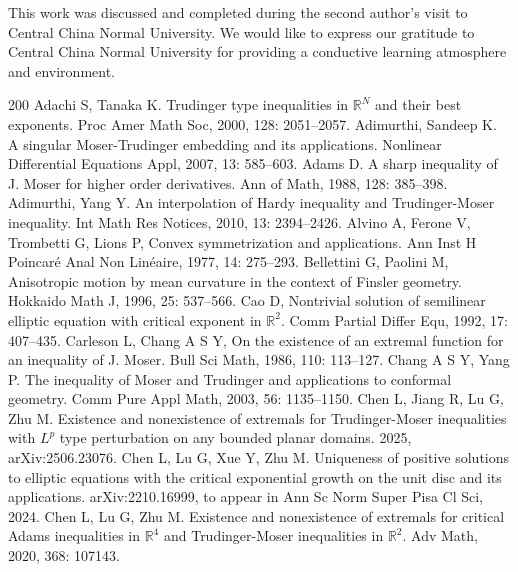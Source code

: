 \documentclass[11pt]{article}
\theoremstyle{plain}
\numberwithin{equation}{section}
\begin{document}
  This work was discussed and completed during the second author's visit to Central China Normal University. We would like to express our gratitude to Central China Normal University for providing a conductive learning atmosphere and environment.\\


\def\refname{References }
\begin{thebibliography}{200}
 Adachi S, Tanaka K. Trudinger type inequalities in $\mathbb{R}^{N}$ and their best exponents. Proc Amer Math Soc, 2000, 128: 2051--2057.
 Adimurthi, Sandeep K. A singular Moser-Trudinger embedding and its applications. Nonlinear Differential Equations Appl, 2007, 13: 585--603.
 Adams D. A sharp inequality of J. Moser for higher order derivatives.  Ann of Math, 1988, 128: 385--398.
 Adimurthi,  Yang Y. An interpolation of Hardy inequality and Trudinger-Moser inequality. Int Math Res Notices, 2010, 13: 2394--2426.
 Alvino A, Ferone V, Trombetti G, Lions P, Convex symmetrization and applications. Ann Inst H Poincar\'{e} Anal Non Lin\'{e}aire, 1977, 14: 275--293.
 Bellettini G, Paolini M, Anisotropic motion by mean curvature in the context of Finsler geometry.  Hokkaido Math J, 1996, 25: 537--566.
 Cao D,  Nontrivial solution of semilinear elliptic equation with critical exponent in $\mathbb{R}^{2}$.  Comm Partial Differ Equ,
1992, 17: 407--435.
 Carleson  L, Chang A S Y, On the existence of an extremal function for an inequality of J. Moser. Bull Sci Math, 1986, 110: 113--127.
  Chang A S Y,  Yang P. The inequality of Moser and Trudinger and applications to conformal
geometry. Comm Pure Appl Math,  2003, 56:  1135--1150.
 Chen L, Jiang R, Lu G, Zhu M. Existence and nonexistence of extremals for Trudinger-Moser inequalities with $L^p$ type perturbation on any bounded planar domains. 2025, arXiv:2506.23076.
 Chen L,  Lu G, Xue Y, Zhu M. Uniqueness of positive solutions to elliptic equations with the critical exponential growth on the unit disc and its applications. arXiv:2210.16999, to appear in Ann Sc Norm Super Pisa Cl Sci, 2024.
 Chen L, Lu G, Zhu M.  Existence and nonexistence of extremals for critical Adams inequalities in $\mathbb{R}^4$ and Trudinger-Moser
inequalities in $\mathbb{R}^2$. Adv Math,  2020, 368: 107143.

\end{thebibliography}
\end{document}
